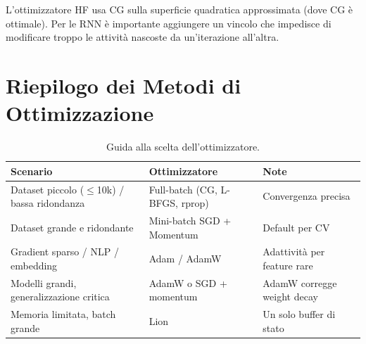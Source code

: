 L'ottimizzatore HF usa CG sulla superficie quadratica approssimata (dove CG è
ottimale). Per le RNN è importante aggiungere un vincolo che impedisce di
modificare troppo le attività nascoste da un'iterazione all'altra.

\section{Riepilogo dei Metodi di Ottimizzazione}
\label{sec:optim-summary}

\begin{table}[H]
  \centering
  \caption{Guida alla scelta dell'ottimizzatore.}
  \label{tab:optim_guide}
  \small
  \begin{tabularx}{\linewidth}{X l X}
    \toprule
    \textbf{Scenario} & \textbf{Ottimizzatore} & \textbf{Note} \\
    \midrule
    Dataset piccolo ($\leq$10k) / bassa ridondanza & Full-batch (CG, L-BFGS, rprop) & Convergenza precisa \\
    Dataset grande e ridondante                    & Mini-batch SGD + Momentum       & Default per CV \\
    Gradient sparso / NLP / embedding              & Adam / AdamW                    & Adattività per feature rare \\
    Modelli grandi, generalizzazione critica        & AdamW o SGD + momentum          & AdamW corregge weight decay \\
    Memoria limitata, batch grande                 & Lion                            & Un solo buffer di stato \\
    \bottomrule
  \end{tabularx}
\end{table}

